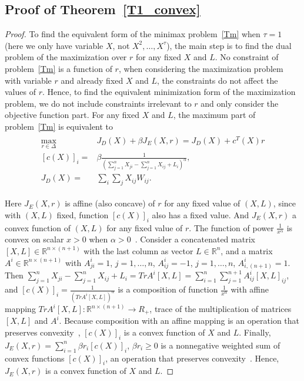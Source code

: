\documentclass[10pt,twocolumn,twoside,english]{IEEEtran}
\begin{document}
\subsection{Proof of Theorem~\ref{T1_convex}}
\label{appendix_T1}
\begin{proof}To find the equivalent form of the minimax problem~\eqref{Tm} when $\tau=1$ (here we only have variable $X$, not $X^2,\dots, X^{\tau}$), the main step is to find the dual problem of the maximization over $r$ for any fixed $X$ and $L$. No constraint of problem~\eqref{Tm} is a function of $r$, when considering the maximization problem with variable $r$ and already fixed $X$ and $L$, the constraints do not affect the values of $r$. Hence, to find the equivalent minimization form of the maximization problem, we do not include constraints irrelevant to $r$ and only consider the objective function part. For any fixed $X$ and $L$, the maximum part of problem~\eqref{Tm} is equivalent to
\begin{align}
\begin{split}
\underset{r\in \Delta}{\text{max}}\quad & J_D(X)+\beta J_E(X,r)=J_D(X)+ c^T(X) r\\
[c(X)]_i= &\beta\frac{1}{(\sum\limits_{j=1}^{n} X_{ji}-\sum\limits_{j=1}^{n}X_{ij}+ L_i)^\alpha}, \\
J_D(X)=&\sum_{i} \sum_{j}X_{ij} W_{ij}.
\end{split}
\label{primal}
\end{align}


Here $J_E(X,r)$ is affine (also concave) of $r$ for any fixed value of $(X,L)$, since with $(X,L)$ fixed, function $[c(X)]_i$ also has a fixed value. And $J_E(X,r)$ a convex function of $(X,L)$ for any fixed value of $r$. The function of power $\frac{1}{x^{\alpha}}$ is convex on scalar $x>0$ when $\alpha>0$~\cite[Chapter 3.1.5]{book_convex}. Consider a concatenated matrix $[X,L]\in \mathbb{R}^{n\times (n+1)}$ with the last column as vector $L\in\mathbb{R}^{n}$, and a matrix $A^i \in \mathbb{R}^{n\times (n+1)}$ with $A^i_{ji}=1$, $j=1,\dots,n$, $A^i_{ij}=-1$, $j=1,\dots,n$, $A^i_{i,(n+1)}=1$. Then $\sum\limits_{j=1}^{n} X_{ji}-\sum\limits_{j=1}^{n}X_{ij}+ L_i=Tr A^i [X,L]=\sum\limits_{i=1}^n\sum\limits_{j=1}^{n+1} A^i_{ij} [X,L]_{ij}$,  and $[c(X)]_i=\frac{1}{(Tr A^i [X,L])^{\alpha}}$ is a composition of function $\frac{1}{x^{\alpha}}$ with affine mapping $Tr A^i [X,L]: \mathbb{R}^{n \times (n+1)} \to R_+$, trace of the multiplication of matrices $[X,L]$ and $A^i$. Because composition with an affine mapping is an operation that preserves convexity~\cite[Chapter 3.2.2]{book_convex}, $[c(X)]_i$ is a convex function of $X$ and $L$. Finally, $J_E(X,r)=\sum\limits_{i=1}^n \beta r_i [c(X)]_i$, $\beta r_i \geqslant 0$ is a nonnegative weighted sum of convex functions $[c(X)]_i$, an operation that preserves convexity~\cite[Chapter 3.2.1]{book_convex}. Hence, $J_E(X,r)$ is a convex function of $X$ and $L$. 


\end{proof}
\end{document}
